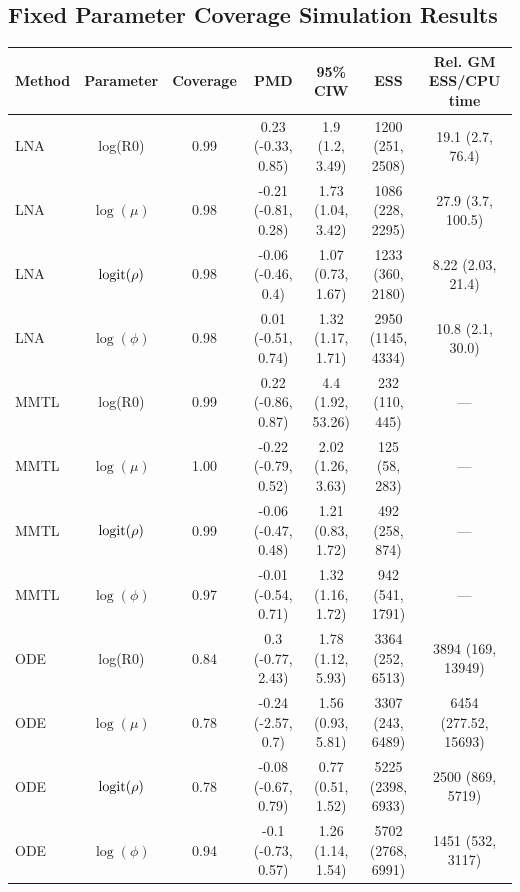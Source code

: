 \subsection{Fixed Parameter Coverage Simulation Results}
\label{subsec:lna_fixedpar_results}
\begin{table}
		\small
		\centering
		\begin{tabular}{lcccccc}
			\hline
			\textbf{Method} & \textbf{Parameter} & \textbf{Coverage} & \textbf{PMD} & \textbf{95\% CIW} & \textbf{ESS} & \textbf{Rel. GM ESS/CPU time} \\ 
			\hline
			LNA & log(R0) & 0.99 & 0.23 (-0.33, 0.85) & 1.9 (1.2, 3.49) & 1200 (251, 2508) & 19.1 (2.7, 76.4) \\ 
			LNA & $\log(\mu)$ & 0.98 & -0.21 (-0.81, 0.28) & 1.73 (1.04, 3.42) & 1086 (228, 2295) & 27.9 (3.7, 100.5) \\ 
			LNA & $\mathrm{logit}(\rho)$ & 0.98 & -0.06 (-0.46, 0.4) & 1.07 (0.73, 1.67) & 1233 (360, 2180) & 8.22 (2.03, 21.4) \\ 
			LNA & $\log(\phi)$ & 0.98 & 0.01 (-0.51, 0.74) & 1.32 (1.17, 1.71) & 2950 (1145, 4334) & 10.8 (2.1, 30.0) \\ 
			MMTL & log(R0) & 0.99 & 0.22 (-0.86, 0.87) & 4.4 (1.92, 53.26) & 232 (110, 445) & --- \\ 
			MMTL & $\log(\mu)$ & 1.00 & -0.22 (-0.79, 0.52) & 2.02 (1.26, 3.63) & 125 (58, 283) & --- \\ 
			MMTL & $\mathrm{logit}(\rho)$ & 0.99 & -0.06 (-0.47, 0.48) & 1.21 (0.83, 1.72) & 492 (258, 874) & --- \\ 
			MMTL & $\log(\phi)$ & 0.97 & -0.01 (-0.54, 0.71) & 1.32 (1.16, 1.72) & 942 (541, 1791) & --- \\ 
			ODE & log(R0) & 0.84 & 0.3 (-0.77, 2.43) & 1.78 (1.12, 5.93) & 3364 (252, 6513) & 3894 (169, 13949) \\ 
			ODE & $\log(\mu)$ & 0.78 & -0.24 (-2.57, 0.7) & 1.56 (0.93, 5.81) & 3307 (243, 6489) & 6454 (277.52, 15693) \\ 
			ODE & $\mathrm{logit}(\rho)$ & 0.78 & -0.08 (-0.67, 0.79) & 0.77 (0.51, 1.52) & 5225 (2398, 6933) & 2500 (869, 5719) \\ 
			ODE & $\log(\phi)$ & 0.94 & -0.1 (-0.73, 0.57) & 1.26 (1.14, 1.54) & 5702 (2768, 6991) & 1451 (532, 3117) \\ 
			\hline
		\end{tabular}

\end{table}
